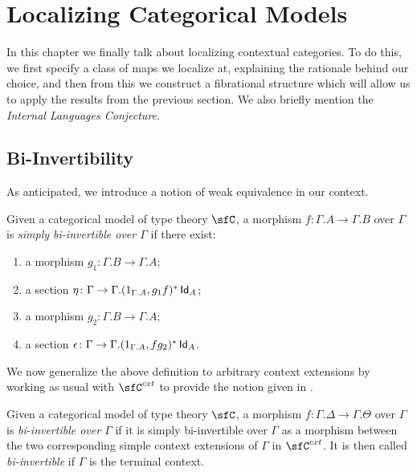 \chapter{Localizing Categorical Models}

In this chapter we finally talk about localizing contextual categories. To do
this, we first specify a class of maps we localize at, explaining the rationale
behind our choice, and then from this we construct a fibrational structure which
will allow us to apply the results from the previous section. We also briefly
mention the \emph{Internal Languages Conjecture}.

\section{Bi-Invertibility}

As anticipated, we introduce a notion of weak equivalence in our context.

\begin{defn}
  Given a categorical model of type theory $\sfC$, a morphism
  $f\colon\Gamma.A\rightarrow\Gamma.B$ over $\Gamma$ is \emph{simply
    bi-invertible over $\Gamma$} if there exist:
  \begin{enumerate}
    \item a morphism $g_1\colon\Gamma.B\rightarrow\Gamma.A$;
    \item a section
      $\eta\colon\Gamma\rightarrow\Gamma.(1_{\Gamma.A},g_1f)^*\operatorname{\mathsf{Id}}_{A}$;
    \item a morphism $g_2\colon\Gamma.B\rightarrow\Gamma.A$;
    \item a section
      $\epsilon\colon\Gamma\rightarrow\Gamma.(1_{\Gamma.A},fg_2)^*\operatorname{\mathsf{Id}}_{A}$.
  \end{enumerate}
\end{defn}

We now generalize the above definition to arbitrary context extensions by
working as usual with $\sfC^{cxt}$ to provide the notion given in
\cite[Def.~1.4]{Kap17}.

\begin{defn}
  Given a categorical model of type theory $\sfC$, a morphism
  $f\colon\Gamma.\Delta\rightarrow\Gamma.\Theta$ over $\Gamma$ is
  \emph{bi-invertible over $\Gamma$} if it is simply bi-invertible over $\Gamma$
  as a morphism between the two corresponding simple context extensions of
  $\Gamma$ in $\sfC^{cxt}$. It
  is then called \emph{bi-invertible} if $\Gamma$ is the terminal
  context.
\end{defn}

